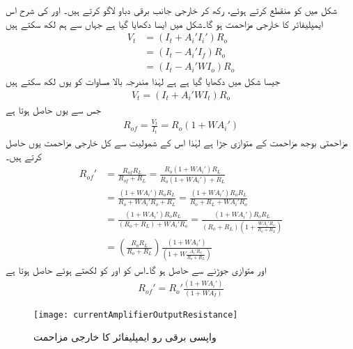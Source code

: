 شکل  میں  کو منقطع کرتے ہوئے،  رکھ  کر خارجی جانب برقی دباو  لاگو کرتے ہیں۔ اور  کی شرح اس ایمپلیفائر کا خارجی مزاحمت  ہو گا۔شکل  میں ایسا دکھایا گیا ہے جہاں سے ہم لکھ سکتے ہیں
\begin{align*}
V_t&=\left(I_t+A_i' I_i' \right ) R_o \\
&=\left(I_t-A_i' I_f \right ) R_o \\
&=\left(I_t-A_i' W I_o \right ) R_o 
\end{align*}
جیسا شکل میں دکھایا گیا ہے   ہے لہٰذا مندرجہ بالا مساوات کو یوں لکھ سکتے ہیں
\begin{align*}
V_t=\left (I_t +A_i' W I_t\right ) R_o
\end{align*}
جس سے  یوں حاصل ہوتا ہے
\begin{align}
R_{of}=\frac{V_t}{I_t}=R_o \left (1+W A_i' \right )
\end{align}
مزاحمتی بوجھ  مزاحمت  کے متوازی جڑا ہے لہٰذا اس کے شمولیت سے کل خارجی مزاحمت   یوں حاصل کرتے ہیں۔
\begin{align*}
R_{of}'&=\frac{R_{of} R_L}{R_{of}+R_L}=\frac{R_o \left (1+W A_i'\right ) R_L}{R_o \left (1+W A_i'\right )+R_L}\\
&=\frac{\left (1+W A_i'\right )R_o R_L}{R_o+W A_i' R_o+R_L}=\frac{\left (1+W A_i'\right )R_o R_L}{R_o+R_L+W A_i' R_o}\\
&=\frac{\left (1+W A_i'\right )R_o R_L}{\left (R_o+R_L\right)+W A_i' R_o}=\frac{\left (1+W A_i'\right )R_o R_L}{\left (R_o+R_L\right) \left (1+ \frac{W A_i' R_o}{R_o+R_L}\right )} \\
&=\left(\frac{R_o R_L}{R_o+R_L} \right) \frac{\left (1+W A_i' \right )}{\left (1+W \frac{A_i' R_o}{R_o+R_L} \right )}
\end{align*}
  اور  متوازی جوڑنے سے   حاصل ہو گا۔اس کو   اور   کو  لکھتے ہوئے حاصل ہوتا ہے
\begin{align} 
R_{of}'=R_o' \frac{\left (1+W A_i'\right )}{\left (1+ W A_I\right )}
\end{align}
%
\begin{figure}
\centering
\texttt{[image: currentAmplifierOutputResistance]}
\caption{واپسی برقی رو ایمپلیفائر کا خارجی مزاحمت}
\label{شکل_واپسی_برقی_رو_ایمپلیفائر_خارجی_مزاحمت}
\end{figure}


